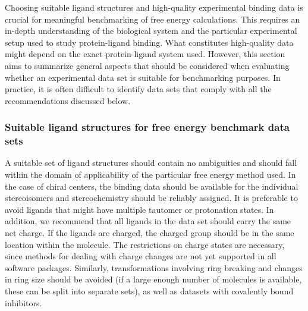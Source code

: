 \documentclass[9pt,bestpractices]{livecoms}
\begin{document}
Choosing suitable ligand structures and high-quality experimental binding data is crucial for  meaningful benchmarking of free energy calculations. This requires an in-depth understanding of the biological system and the particular experimental setup used to study protein-ligand binding. What constitutes high-quality data might depend on the exact protein-ligand system used. However, this section aims to summarize general aspects that should be considered when evaluating whether an experimental data set is suitable for benchmarking purposes. In practice, it is often difficult to identify data sets that comply with all the recommendations discussed below.

\subsubsection{Suitable ligand structures for free energy benchmark data sets}
A suitable set of ligand structures should contain no ambiguities and should fall within the domain of applicability of the particular free energy method used. In the case of chiral centers, the binding data should be available for the individual stereoisomers and stereochemistry should be reliably assigned. It is preferable to avoid ligands that might have multiple tautomer or protonation states. In addition, we recommend that all ligands in the data set should carry the same net charge. If the ligands are charged, the charged group should be in the same location within the molecule. The restrictions on charge states are necessary, since methods for dealing with charge changes are not yet supported in all software packages. Similarly, transformations involving ring breaking and changes in ring size should be avoided (if a large enough number of molecules is available, these can be split into separate sets), as well as datasets with covalently bound inhibitors.
\end{document}
